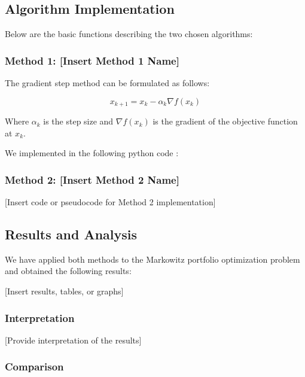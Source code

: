 \documentclass[12pt]{article}
\begin{document}
\subsection*{Algorithm Implementation}

Below are the basic functions describing the two chosen algorithms:

\subsubsection*{Method 1: [Insert Method 1 Name]}


The gradient step method can be formulated as follows:

\begin{equation}
    x_{k+1} = x_k - \alpha_k \nabla f(x_k)
\end{equation}
    
Where $\alpha_k$ is the step size and $\nabla f(x_k)$ is the gradient of the objective function at $x_k$.

We implemented in the following python code :



\subsubsection*{Method 2: [Insert Method 2 Name]}

[Insert code or pseudocode for Method 2 implementation]

\subsection*{Results and Analysis}

We have applied both methods to the Markowitz portfolio optimization problem and obtained the following results:

[Insert results, tables, or graphs]

\subsubsection*{Interpretation}

[Provide interpretation of the results]

\subsubsection*{Comparison}
\end{document}
